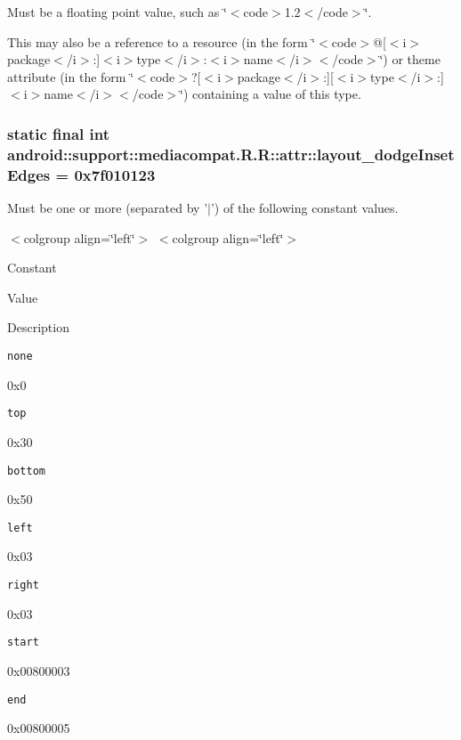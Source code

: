 Must be a floating point value, such as \char`\"{}$<$code$>$1.2$<$/code$>$\char`\"{}. 

This may also be a reference to a resource (in the form \char`\"{}$<$code$>$@\mbox{[}$<$i$>$package$<$/i$>$:\mbox{]}$<$i$>$type$<$/i$>$:$<$i$>$name$<$/i$>$$<$/code$>$\char`\"{}) or theme attribute (in the form \char`\"{}$<$code$>$?\mbox{[}$<$i$>$package$<$/i$>$:\mbox{]}\mbox{[}$<$i$>$type$<$/i$>$:\mbox{]}$<$i$>$name$<$/i$>$$<$/code$>$\char`\"{}) containing a value of this type. \hypertarget{classandroid_1_1support_1_1mediacompat_1_1_r_1_1attr_3542cefb8ae1c01d3a8ababc5ed31647}{
\subsubsection[{layout\_\-dodgeInsetEdges}]{\setlength{\rightskip}{0pt plus 5cm}static final int android::support::mediacompat.R.R::attr::layout\_\-dodgeInsetEdges = 0x7f010123}}
\label{classandroid_1_1support_1_1mediacompat_1_1_r_1_1attr_3542cefb8ae1c01d3a8ababc5ed31647}


Must be one or more (separated by '$|$') of the following constant values. \begin{TabularC}{0}
\hline
\end{TabularC}
$<$colgroup align=\char`\"{}left\char`\"{}$>$ $<$colgroup align=\char`\"{}left\char`\"{}$>$ 

Constant

Value

Description 

{\tt none}

0x0

{\tt top}

0x30

{\tt bottom}

0x50

{\tt left}

0x03

{\tt right}

0x03

{\tt start}

0x00800003

{\tt end}

0x00800005

